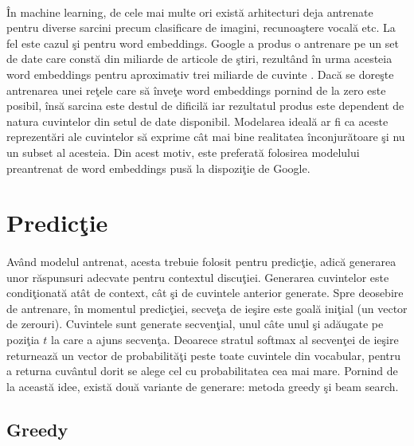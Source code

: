 \paragraph{}
\^ In machine learning, de cele mai multe ori exist\u a arhitecturi deja antrenate pentru diverse sarcini precum clasificare de imagini, recunoa\c stere vocal\u a etc. La fel este cazul \c si pentru word embeddings. Google a produs o antrenare pe un set de date care const\u a din miliarde de articole de \c stiri, rezult\^ and \^ in urma acesteia word embeddings pentru aproximativ trei miliarde de cuvinte \cite{word2vec}. Dac\u a se dore\c ste antrenarea unei re\c tele care s\u a \^ inve\c te word embeddings pornind de la zero este posibil, \^ ins\u a sarcina este destul de dificil\u a iar rezultatul produs este dependent de natura cuvintelor din setul de date disponibil. Modelarea ideal\u a ar fi ca aceste reprezent\u ari ale cuvintelor s\u a exprime c\^ at mai bine realitatea \^ inconjur\u atoare \c si nu un subset al acesteia. Din acest motiv, este preferat\u a folosirea modelului preantrenat de word embeddings pus\u a la dispozi\c tie de Google.

\section{Predic\c tie}

\paragraph{}
Av\^ and modelul antrenat, acesta trebuie folosit pentru predic\c tie, adic\u a generarea unor r\u aspunsuri adecvate pentru contextul discu\c tiei. Generarea cuvintelor este condi\c tionat\u a at\^ at de context, c\^ at \c si de cuvintele anterior generate. Spre deosebire de antrenare, \^ in momentul predic\c tiei, secve\c ta de ie\c sire este goal\u a ini\c tial (un vector de zerouri). Cuvintele sunt generate secven\c tial, unul c\^ ate unul \c si ad\u augate pe pozi\c tia \(t\) la care a ajuns secven\c ta. Deoarece stratul softmax al secven\c tei de ie\c sire returneaz\u a un vector de probabilit\u a\c ti peste toate cuvintele din vocabular, pentru a returna cuv\^ antul dorit se alege cel cu probabilitatea cea mai mare. Pornind de la aceast\u a idee, exist\u a dou\u a variante de generare: metoda greedy \c si beam search.

\subsection{Greedy}


